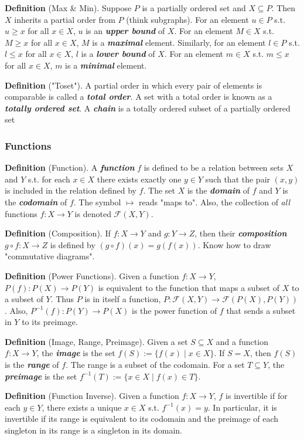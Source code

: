 \textbf{Definition} (Max \& Min). Suppose $P$ is a partially ordered set and $X\subseteq P$. Then $X$ inherits a partial order from $P$ (think subgraphs). For an element $u\in P$ s.t. $u\geq x$ for all $x\in X$, $u$ is an \textbf{\textit{upper bound}} of $X$. For an element $M\in X$ s.t. $M\geq x$ for all $x\in X$, $M$ is a \textbf{\textit{maximal}} element. Similarly, for an element $l\in P$ s.t. $l\leq x$ for all $x\in X$, $l$ is a \textbf{\textit{lower bound}} of $X$. For an element $m\in X$ s.t. $m\leq x$ for all $x\in X$, $m$ is a \textbf{\textit{minimal}} element.

\textbf{Definition} ("Toset"). A partial order in which every pair of elements is comparable is called a \textbf{\textit{total order}}. A set with a total order is known as a \textbf{\textit{totally ordered set}}. A \textbf{\textit{chain}} is a totally ordered subset of a partially ordered set

\subsubsection{Functions}
\textbf{Definition} (Function). A \textbf{\textit{function}} $f$ is defined to be a relation between sets $X$ and $Y$ s.t. for each $x\in X$ there exists exactly one $y\in Y$ such that the pair $(x,y)$ is included in the relation defined by $f$. The set $X$ is the \textbf{\textit{domain}} of $f$ and $Y$ is the \textbf{\textit{codomain}} of $f$. The symbol $\mapsto$ reads "maps to". Also, the collection of \textit{all} functions $f:X\to Y$ is denoted $\mathcal{F}(X,Y)$.

\textbf{Definition} (Composition). If $f:X\to Y$ and $g:Y\to Z$, then their \textbf{\textit{composition}} $g\circ f:X\to Z$ is defined by $(g\circ f)(x)=g(f(x))$. Know how to draw "commutative diagrams".

\textbf{Definition} (Power Functions). Given a function $f:X\to Y$, $P(f):P(X)\to P(Y)$ is equivalent to the function that maps a subset of $X$ to a subset of $Y$. Thus $P$ is in itself a function, $P: \mathcal{F}(X,Y)\to \mathcal{F}(P(X),P(Y))$. Also, $P^{-1}(f):P(Y)\to P(X)$ is the power function of $f$ that sends a subset in $Y$ to its preimage.

\textbf{Definition} (Image, Range, Preimage). Given a set $S\subseteq X$ and a function $f:X\to Y$, the \textbf{\textit{image}} is the set $f(S):=\{f(x)\mid x\in X\}$. If $S=X$, then $f(S)$ is the \textbf{\textit{range}} of $f$. The range is a subset of the codomain. For a set $T\subseteq Y$, the \textbf{\textit{preimage}} is the set $f^{-1}(T):=\{x\in X\mid f(x)\in T\}$. 

\textbf{Definition} (Function Inverse). Given a function $f:X\to Y$, $f$ is invertible if for each $y\in Y$, there exists a unique $x\in X$ s.t. $f^{-1}(x)=y$. In particular, it is invertible if its range is equivalent to its codomain and the preimage of each singleton in its range is a singleton in its domain.









\newpage %

